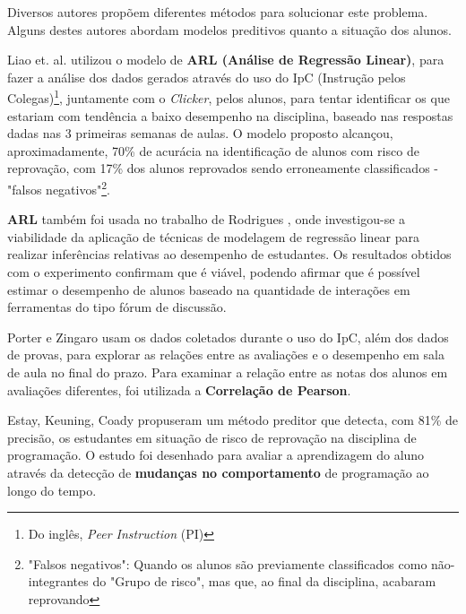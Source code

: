 \documentclass[
	12pt,				%
	openright,			%
	oneside,
	a4paper,			%
	english,			%
	french,				%
	spanish,			%
	brazil,				%
	]{abntex2}
\begin{document}
Diversos autores propõem diferentes métodos para solucionar este problema. Alguns destes autores abordam modelos preditivos quanto a situação dos alunos.

Liao et. al. \cite{liao2016lightweight} utilizou o modelo de \textbf{ARL (Análise de Regressão Linear)}, para fazer a análise dos dados gerados através do uso do IpC (Instrução pelos Colegas)\footnote[1]{Do inglês, \textit{Peer Instruction} (PI)}, juntamente com o \textit{Clicker}, pelos alunos, para tentar identificar os que estariam com tendência a baixo desempenho na disciplina, baseado nas respostas dadas nas 3 primeiras semanas de aulas. O modelo proposto alcançou, aproximadamente, 70\% de acurácia na identificação de alunos com risco de reprovação, com 17\% dos alunos reprovados sendo erroneamente classificados - "falsos negativos"\footnote[2]{"Falsos negativos": Quando os alunos são previamente classificados como não-integrantes do "Grupo de risco", mas que, ao final da disciplina, acabaram reprovando}.

\textbf{ARL} também foi usada no trabalho de Rodrigues \cite{rodrigues2013modelo}, onde investigou-se a viabilidade da aplicação de técnicas de modelagem de regressão linear para realizar inferências relativas ao desempenho de estudantes. Os resultados obtidos com o experimento confirmam que é viável, podendo afirmar que é possível estimar o desempenho de alunos baseado na quantidade de interações em ferramentas do tipo fórum de discussão. 

Porter e Zingaro \cite{porter2014importance} usam os dados coletados durante o uso do IpC, além dos dados de provas, para explorar as relações entre as avaliações e o desempenho em sala de aula no final do prazo. Para examinar a relação entre as notas dos alunos em avaliações diferentes, foi utilizada a \textbf{Correlação de Pearson}.

Estay, Keuning, Coady \cite{estey2017automatically} propuseram um método preditor que detecta, com 81\% de precisão, os estudantes em situação de risco de reprovação na disciplina de programação. O estudo foi desenhado para avaliar a aprendizagem do aluno através da detecção de \textbf{mudanças no comportamento} de programação ao longo do tempo. 
\end{document}
